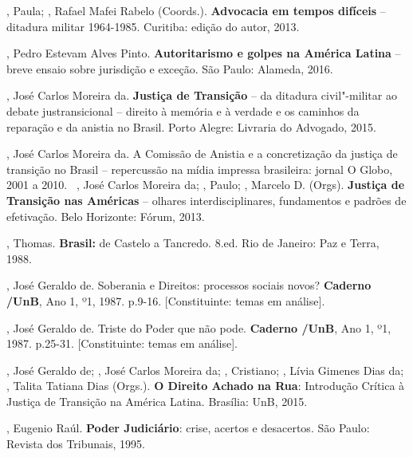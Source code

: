, Paula; , Rafael Mafei Rabelo (Coords.).
\textbf{Advocacia em tempos difíceis} -- ditadura militar 1964-1985.
Curitiba: edição do autor, 2013.

, Pedro Estevam Alves Pinto. \textbf{Autoritarismo e golpes na
América Latina} -- breve ensaio sobre jurisdição e exceção. São Paulo:
Alameda, 2016.

 , José Carlos Moreira da. \textbf{Justiça de Transição} -- da
ditadura civil"-militar ao debate justransicional -- direito à memória e à
verdade e os caminhos da reparação e da anistia no Brasil. Porto Alegre:
Livraria do Advogado, 2015.

 , José Carlos Moreira da. A Comissão de Anistia e a
concretização da justiça de transição no Brasil -- repercussão na mídia
impressa brasileira: jornal O Globo, 2001 a 2010.~ , José
Carlos Moreira da; , Paulo; , Marcelo D. (Orgs).
\textbf{Justiça de Transição nas Américas} -- olhares interdisciplinares,
fundamentos e padrões de efetivação. Belo Horizonte: Fórum, 2013.

, Thomas. \textbf{Brasil:} de Castelo a Tancredo. 8.ed. Rio de
Janeiro: Paz e Terra, 1988.

 , José Geraldo de. Soberania e Direitos: processos sociais
novos? \textbf{Caderno /UnB}, Ano 1, º1, 1987. p.9-16.
{[}Constituinte: temas em análise{]}.

 , José Geraldo de. Triste do Poder que não pode.
\textbf{Caderno /UnB}, Ano 1, º1, 1987. p.25-31. {[}Constituinte:
temas em análise{]}.

 , José Geraldo de;  , José Carlos Moreira da;
, Cristiano; , Lívia Gimenes Dias da; , Talita
Tatiana Dias (Orgs.). \textbf{O Direito Achado na Rua}: Introdução
Crítica à Justiça de Transição na América Latina. Brasília: UnB, 2015.

, Eugenio Raúl. \textbf{Poder Judiciário}: crise, acertos e
desacertos. São Paulo: Revista dos Tribunais, 1995.
